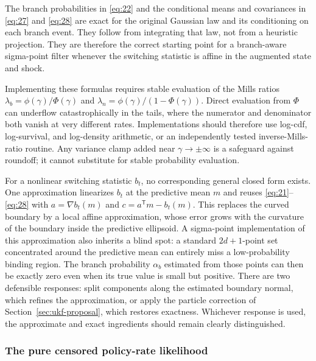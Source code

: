 \documentclass[11pt]{article}
\begin{document}
The branch probabilities in \eqref{eq:22} and the conditional means and covariances in \eqref{eq:27} and \eqref{eq:28} are exact for the original Gaussian law and its conditioning on each branch event. They follow from integrating that law, not from a heuristic projection. They are therefore the correct starting point for a branch-aware sigma-point filter whenever the switching statistic is affine in the augmented state and shock.

Implementing these formulas requires stable evaluation of the Mills ratios $\lambda_b=\phi(\gamma)/\Phi(\gamma)$ and $\lambda_n=\phi(\gamma)/(1-\Phi(\gamma))$. Direct evaluation from $\Phi$ can underflow catastrophically in the tails, where the numerator and denominator both vanish at very different rates. Implementations should therefore use log-cdf, log-survival, and log-density arithmetic, or an independently tested inverse-Mills-ratio routine. Any variance clamp added near $\gamma\to\pm\infty$ is a safeguard against roundoff; it cannot substitute for stable probability evaluation.

For a nonlinear switching statistic $b_t$, no corresponding general closed form exists. One approximation linearizes $b_t$ at the predictive mean $m$ and reuses \eqref{eq:21}--\eqref{eq:28} with $a=\nabla b_t(m)$ and $c=a^{\mathsf T}m-b_t(m)$. This replaces the curved boundary by a local affine approximation, whose error grows with the curvature of the boundary inside the predictive ellipsoid. A sigma-point implementation of this approximation also inherits a blind spot: a standard $2d+1$-point set concentrated around the predictive mean can entirely miss a low-probability binding region. The branch probability $\alpha_b$ estimated from those points can then be exactly zero even when its true value is small but positive. There are two defensible responses: split components along the estimated boundary normal, which refines the approximation, or apply the particle correction of Section~\ref{sec:ukf-proposal}, which restores exactness. Whichever response is used, the approximate and exact ingredients should remain clearly distinguished.

\subsubsection{The pure censored policy-rate likelihood}
\label{sec:ukf-censored}
\end{document}
